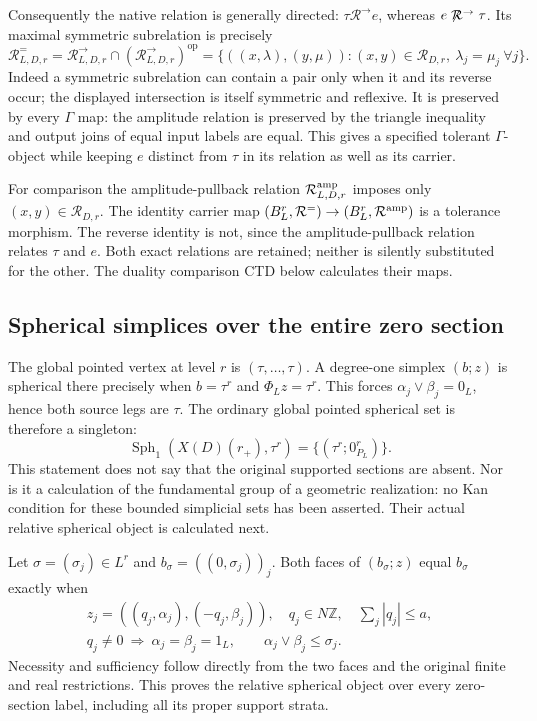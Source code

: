Consequently the native relation is generally directed:
$\tau\mathrel{\mathcal R^{\to}}e$, whereas
$e\not\mathrel{\mathcal R^{\to}}\tau$. Its maximal symmetric
subrelation is precisely
\begin{equation}\tag{ASC7}
\mathcal R^{=}_{L,D,r}
 =\mathcal R^{\to}_{L,D,r}\cap
      (\mathcal R^{\to}_{L,D,r})^{\mathrm{op}}
 =\{((x,\lambda),(y,\mu)):
       (x,y)\in\mathcal R_{D,r},\ \lambda_j=\mu_j\ \forall j\}.
\end{equation}
Indeed a symmetric subrelation can contain a pair only when it
and its reverse occur; the displayed intersection is itself
symmetric and reflexive. It is preserved by every $\Gamma$ map:
the amplitude relation is preserved by the triangle inequality
and output joins of equal input labels are equal. This gives a
specified tolerant $\Gamma$-object while keeping $e$ distinct
from $\tau$ in its relation as well as its carrier.

For comparison the amplitude-pullback relation
$\mathcal R^{\rm amp}_{L,D,r}$ imposes only
$(x,y)\in\mathcal R_{D,r}$. The identity carrier map
$(B_L^r,\mathcal R^=)\to(B_L^r,\mathcal R^{\rm amp})$ is a
tolerance morphism. The reverse identity is not, since the
amplitude-pullback relation relates $\tau$ and $e$. Both exact
relations are retained; neither is silently substituted for the
other. The duality comparison CTD below calculates their maps.

\subsection{Spherical simplices over the entire zero section}

The global pointed vertex at level $r$ is $(\tau,\ldots,\tau)$.
A degree-one simplex $(b;z)$ is spherical there precisely when
$b=\tau^r$ and $\Phi_Lz=\tau^r$. This forces
$\alpha_j\vee\beta_j=0_L$, hence both source legs are $\tau$.
The ordinary global pointed spherical set is therefore a singleton:
\begin{equation}\tag{ASC8}
\operatorname{Sph}_1(X(D)(r_+),\tau^r)=\{(\tau^r;0_{P_L}^r)\}.
\end{equation}
This statement does not say that the original supported sections
are absent. Nor is it a calculation of the fundamental group of a
geometric realization: no Kan condition for these bounded simplicial
sets has been asserted. Their actual relative spherical object is
calculated next.

Let $\sigma=(\sigma_j)\in L^r$ and
$b_\sigma=((0,\sigma_j))_j$. Both faces of $(b_\sigma;z)$ equal
$b_\sigma$ exactly when
\begin{equation}\tag{ASC9}
\begin{gathered}
z_j=((q_j,\alpha_j),(-q_j,\beta_j)),\quad
q_j\in N\mathbb Z,\quad \sum_j|q_j|\le a,\\
q_j\ne0\ \Longrightarrow\ \alpha_j=\beta_j=1_L,
\qquad \alpha_j\vee\beta_j\le\sigma_j.
\end{gathered}
\end{equation}
Necessity and sufficiency follow directly from the two faces and
the original finite and real restrictions. This proves the
relative spherical object over every zero-section label, including
all its proper support strata.

